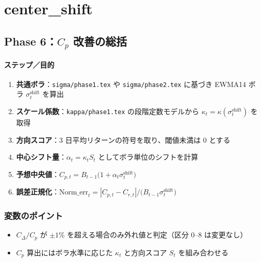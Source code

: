 
\section*{center\_shift}\nopagebreak[4]

\subsection*{Phase 6：$C_p$ 改善の総括}\nopagebreak[4]
\paragraph{ステップ／目的}
\begin{flushleft}
\begin{enumerate}
  \item \textbf{共通ボラ}：{\scriptsize\verb|sigma/phase1.tex|} や {\scriptsize\verb|sigma/phase2.tex|} に基づき
        EWMA14 ボラ \(\sigma_t^{\mathrm{shift}}\) を算出
  \item \textbf{スケール係数}：{\scriptsize\verb|kappa/phase1.tex|} の段階定数モデルから
        \(\kappa_t=\kappa(\sigma_t^{\mathrm{shift}})\) を取得
  \item \textbf{方向スコア}：3 日平均リターンの符号を取り、閾値未満は 0 とする
  \item \textbf{中心シフト量}：\(\alpha_t=\kappa_t S_t\) としてボラ単位のシフトを計算
  \item \textbf{予想中央値}：\(C_{p,t}=B_{t-1}\bigl(1+\alpha_t\sigma_t^{\mathrm{shift}}\bigr)\)
  \item \textbf{誤差正規化}：\(\mathrm{Norm\_err}_t=|C_{p,t}-C_{r,t}|\big/\bigl(B_{t-1}\sigma_t^{\mathrm{shift}}\bigr)\)
\end{enumerate}
\end{flushleft}

\subsubsection*{変数のポイント}
\begin{flushleft}
\begin{itemize}
  \item $C_\Delta/C_p$ が \(\pm1\%\) を超える場合のみ外れ値と判定（区分 0--8 は変更なし）
  \item $C_p$ 算出にはボラ水準に応じた \(\kappa_t\) と方向スコア $S_t$ を組み合わせる
\end{itemize}
\end{flushleft}

\bigskip
